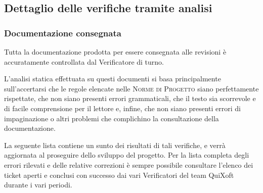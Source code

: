 \documentclass[11pt,a4paper]{article}
\begin{document}
\subsection{Dettaglio delle verifiche tramite analisi}
\subsubsection{Documentazione consegnata}
Tutta la documentazione prodotta per essere consegnata alle revisioni è accuratamente controllata dal Verificatore di turno.

L'analisi statica effettuata su questi documenti si basa principalmente sull'accertarsi che le regole elencate nelle \textsc{Norme di Progetto} siano perfettamente rispettate, che non siano presenti errori grammaticali, che il testo sia scorrevole e di facile comprensione per il lettore e, infine, che non siano presenti errori di impaginazione o altri problemi che complichino la consultazione della documentazione.

La seguente lista contiene un sunto dei risultati di tali verifiche, e verrà aggiornata al proseguire dello sviluppo del progetto.
Per la lista completa degli errori rilevati e delle relative correzioni è sempre possibile consultare l'elenco dei ticket aperti e conclusi con successo dai vari Verificatori del team QuiXoft durante i vari periodi.
\end{document}
